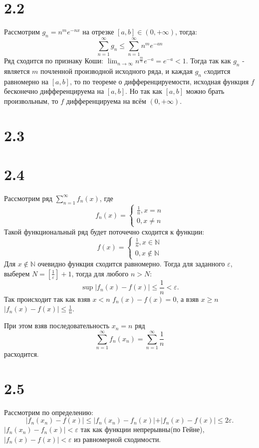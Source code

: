 \documentclass[12pt]{article}
\begin{document}
\section{2.2}
Рассмотрим $g_n = n^m e^{-nx}$ на отрезке $[a, b] \in (0, +\infty)$, тогда: 
\[
    \sum_{n=1}^{\infty} g_n \leq \sum_{n=1}^{\infty} n^m e^{-an}  
\]
Ряд сходится по признаку Коши: $\lim_{n \to \infty} n^{\frac{m}{n}} e^{-a} = e^{-a} < 1$. 
Тогда так как $g_n$ - является $m$ почленной производной исходного ряда, и каждая $g_n$ cходится 
равномерно на $[a, b]$, то по теореме о дифференцируемости, исходная функция $f$ бесконечно дифференцируема на $[a, b]$. 
Но так как $[a, b]$ можно брать произвольным, то $f$ дифференцируема на всём $(0, +\infty )$.     
\section{2.3}
\section{2.4}
Рассмотрим ряд $\sum_{n=1}^{\infty} f_n(x)$, где 
\[
    f_n(x) = 
    \begin{cases}
        \frac{1}{n}, x = n \\
        0, x \neq n
    \end{cases} 
\]  
Такой функциональный ряд будет поточечно сходится к функции: 
\[
    f(x) = 
    \begin{cases}
        \frac{1}{n}, x \in \mathbb{N} \\
        0, x \notin \mathbb{N}
    \end{cases}
\]
Для $x \notin \mathbb{N}$ очевидно функция сходится равномерно. 
Тогда для заданного $\varepsilon$, выберем $N = \left[\frac{1}{\varepsilon}\right] + 1$, тогда для любого 
$n > N$: 
\[
    \sup \vert f_n(x) - f(x) \vert \leq \frac{1}{n} < \varepsilon.
\]  
Так происходит так как взяв $x < n$ $f_n(x) - f(x) = 0$, а взяв $x \geq n$ $\vert f_n(x) - f(x) \vert \leq \frac{1}{n}$.

При этом взяв последовательность $x_n = n$ ряд 
\[
    \sum_{n=1}^{\infty} f_n(x_n) = \sum_{n=1}^{\infty} \frac{1}{n}
\] 
расходится.
\section{2.5}
Рассмотрим по определению: 
\[
    \vert f_n(x_n) - f(x) \vert \leq  
    \vert f_n(x_n) - f_n(x) \vert + \vert f_n(x) - f(x) \vert \leq 2 \varepsilon.
\]
$\vert f_n(x_n) - f_n(x) \vert < \varepsilon $ так как функции непрерывны(по Гейне), 
$\vert f_n(x) - f(x) \vert < \varepsilon $ из равномерной сходимости.
\end{document}
